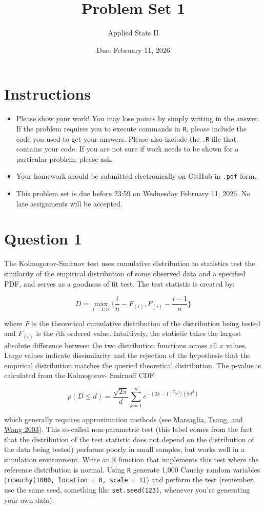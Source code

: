 \documentclass[12pt,letterpaper]{article}
\title{Problem Set 1}
\date{Due: February 11, 2026}
\author{Applied Stats II}
\begin{document}
	\maketitle
	\section*{Instructions}
	\begin{itemize}
	\item Please show your work! You may lose points by simply writing in the answer. If the problem requires you to execute commands in \texttt{R}, please include the code you used to get your answers. Please also include the \texttt{.R} file that contains your code. If you are not sure if work needs to be shown for a particular problem, please ask.
\item Your homework should be submitted electronically on GitHub in \texttt{.pdf} form.
\item This problem set is due before 23:59 on Wednesday February 11, 2026. No late assignments will be accepted.
	\end{itemize}

	\vspace{.25cm}
\section*{Question 1} 
\vspace{.25cm}
\noindent The Kolmogorov-Smirnov test uses cumulative distribution to statistics test the similarity of the empirical distribution of some observed data and a specified PDF, and serves as a goodness of fit test. The test statistic is created by:

$$D = \max_{i=1:n} \Big\{ \frac{i}{n}  - F_{(i)}, F_{(i)} - \frac{i-1}{n} \Big\}$$

\noindent where $F$ is the theoretical cumulative distribution of the distribution being tested and $F_{(i)}$ is the $i$th ordered value. Intuitively, the statistic takes the largest absolute difference between the two distribution functions across all $x$ values. Large values indicate dissimilarity and the rejection of the hypothesis that the empirical distribution matches the queried theoretical distribution. The p-value is calculated from the Kolmogorov-
Smirnoff CDF:

$$p(D \leq d)= \frac{\sqrt {2\pi}}{d} \sum _{k=1}^{\infty }e^{-(2k-1)^{2}\pi ^{2}/(8d^{2})}$$


\noindent which generally requires approximation methods (see \href{https://core.ac.uk/download/pdf/25787785.pdf}{Marsaglia, Tsang, and Wang 2003}). This so-called non-parametric test (this label comes from the fact that the distribution of the test statistic does not depend on the distribution of the data being tested) performs poorly in small samples, but works well in a simulation environment. Write an \texttt{R} function that implements this test where the reference distribution is normal. Using \texttt{R} generate 1,000 Cauchy random variables (\texttt{rcauchy(1000, location = 0, scale = 1)}) and perform the test (remember, use the same seed, something like \texttt{set.seed(123)}, whenever you're generating your own data).\\
	
\end{document}
